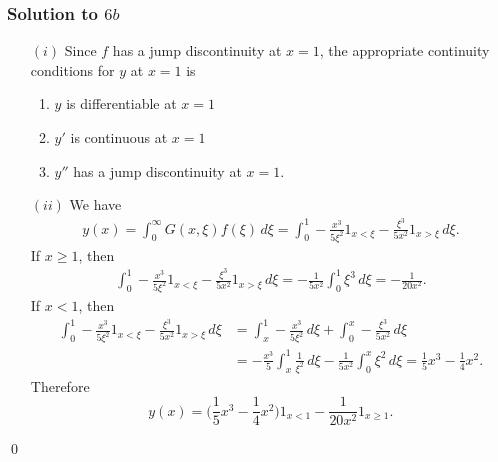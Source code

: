 \subsubsection*{Solution to $6b$}
\begin{enumerate}
\item[$(i)$] Since $f$ has a jump discontinuity at $x = 1$, the appropriate continuity conditions for $y$ at $x = 1$ is
\begin{enumerate}
\item $y$ is differentiable at $x = 1$
\item $y'$ is continuous at $x = 1$
\item $y''$ has a jump discontinuity at $x = 1$.
\end{enumerate}
\item[$(ii)$] We have
\begin{align*}
y(x) = \int_{0}^{\infty}G(x, \xi)f(\xi)\, d\xi = \int_{0}^{1}-\frac{x^{3}}{5\xi^{2}}1_{x < \xi} - \frac{\xi^{3}}{5x^{2}}1_{x > \xi}\, d\xi.
\end{align*}
If $x \geq 1$, then
\begin{align*}
 \int_{0}^{1}-\frac{x^{3}}{5\xi^{2}}1_{x < \xi} - \frac{\xi^{3}}{5x^{2}}1_{x > \xi}\, d\xi = -\frac{1}{5x^{2}}\int_{0}^{1}\xi^{3}\, d\xi = -\frac{1}{20x^{2}}.
\end{align*}
If $x < 1$, then
\begin{align*}
 \int_{0}^{1}-\frac{x^{3}}{5\xi^{2}}1_{x < \xi} - \frac{\xi^{3}}{5x^{2}}1_{x > \xi}\, d\xi & = \int_{x}^{1}-\frac{x^{3}}{5\xi^{2}}\, d\xi + \int_{0}^{x}-\frac{\xi^{3}}{5x^{2}}\, d\xi\\
 & = -\frac{x^{3}}{5}\int_{x}^{1}\frac{1}{\xi^{2}}\, d\xi - \frac{1}{5x^{2}}\int_{0}^{x}\xi^{2}\, d\xi = \frac{1}{5}x^{3} - \frac{1}{4}x^{2}.
\end{align*}
Therefore
$$y(x) = \bigg(\frac{1}{5}x^{3} - \frac{1}{4}x^{2}\bigg)1_{x < 1} - \frac{1}{20x^{2}}1_{x \geq 1}.$$
\end{enumerate}
\hfill\qed

